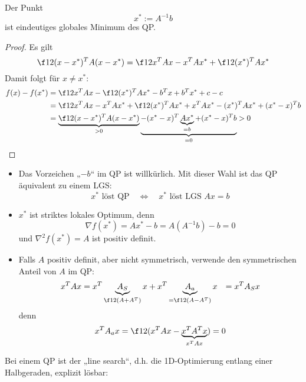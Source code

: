 \documentclass[11pt]{scrbook}
\begin{document}
\begin{st} \label{4.10}
	Der Punkt
	\[
		x^* := A^{-1} b
	\]
	ist eindeutiges globales Minimum des QP.
	\begin{proof}
		Es gilt
		\[
			\f 12 (x-x^*)^T A(x-x^*) = \f 12 x^TAx - x^TAx^* + \f 12 (x^*)^TAx^*
		\]
		Damit folgt für $x \neq x^*$:
		\begin{align*}
			f(x) - f(x^*) &= \f 12 x^T Ax - \f 12 (x^*)^TAx^* - b^Tx + b^Tx^* + c - c \\
			&= \f 12 x^T Ax - x^T Ax^* + \f 12 (x^*)^T Ax^* + x^T Ax^* - (x^*)^T Ax^* + (x^* -x)^Tb \\
			&= \underbrace{\f 12(x-x^*)^T A(x-x^*)}_{>0} \underbrace{- (x^*-x)^T\underbrace{Ax^*}_{=b} + (x^*-x)^Tb}_{=0} > 0
		\end{align*}
	\end{proof}
	\begin{note}
		\begin{itemize}
			\item
				Das Vorzeichen „$-b$“ im QP ist willkürlich.
				Mit dieser Wahl ist das QP äquivalent zu einem LGS:
				\[
					x^* \text{ löst QP} \quad \iff \quad x^* \text{ löst LGS } Ax=b
				\]
			\item
				$x^*$ ist striktes lokales Optimum, denn
				\[
					\nabla f(x^*) = Ax^* - b = A(A^{-1}b) -b = 0
				\]
				und $\nabla^2 f(x^*) = A$ ist positiv definit.
			\item
				Falls $A$ positiv definit, aber nicht symmetrisch, verwende den symmetrischen Anteil von $A$ im QP:
				\begin{align*}
					x^T A x 
					&= x^T \underbrace{A_S}_{\f 12 (A + A^T)} x + x^T \underbrace{A_a}_{= \f 12 (A-A^T)} x 
					&= x^T A_S x
				\end{align*}
				denn
				\[
					x^T A_a x = \f 12 (x^T Ax - \underbrace{x^T A^T x}_{x^T A x}) = 0
				\]
		\end{itemize}
	\end{note}
\end{st}

Bei einem QP ist der „line search“, d.h. die 1D-Optimierung entlang einer Halbgeraden, explizit lösbar:
\end{document}
